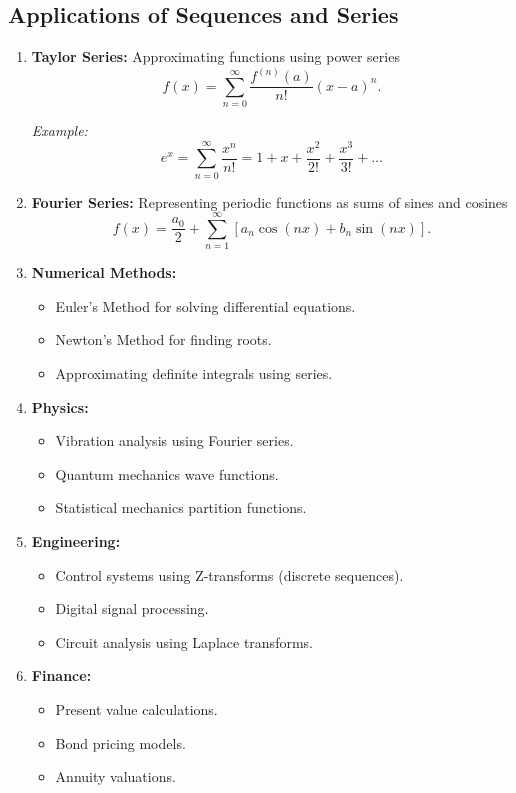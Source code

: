 \documentclass{article}
\begin{document}
\subsection{Applications of Sequences and Series} \label{sequences-applications}

\begin{enumerate}[label=\textbf{\arabic*.}]
    \item \textbf{Taylor Series:} Approximating functions using power series
    \[
    f(x) = \sum_{n=0}^{\infty} \frac{f^{(n)}(a)}{n!}(x-a)^n.
    \]
    
    \textit{Example:} 
    \[
    e^x = \sum_{n=0}^{\infty} \frac{x^n}{n!} = 1 + x + \frac{x^2}{2!} + \frac{x^3}{3!} + \ldots
    \]
    
    \item \textbf{Fourier Series:} Representing periodic functions as sums of sines and cosines
    \[
    f(x) = \frac{a_0}{2} + \sum_{n=1}^{\infty} \left[a_n \cos(nx) + b_n \sin(nx)\right].
    \]
    
    \item \textbf{Numerical Methods:}
    \begin{itemize}
        \item Euler's Method for solving differential equations.
        \item Newton's Method for finding roots.
        \item Approximating definite integrals using series.
    \end{itemize}
    
    \item \textbf{Physics:}
    \begin{itemize}
        \item Vibration analysis using Fourier series.
        \item Quantum mechanics wave functions.
        \item Statistical mechanics partition functions.
    \end{itemize}
    
    \item \textbf{Engineering:}
    \begin{itemize}
        \item Control systems using Z-transforms (discrete sequences).
        \item Digital signal processing.
        \item Circuit analysis using Laplace transforms.
    \end{itemize}
    
    \item \textbf{Finance:}
    \begin{itemize}
        \item Present value calculations.
        \item Bond pricing models.
        \item Annuity valuations.
    \end{itemize}
\end{enumerate}
\end{document}
